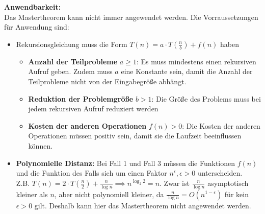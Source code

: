 \documentclass[
../AuD-Zusammenfassung.tex,
]
{subfiles}
\begin{document}
\textbf{Anwendbarkeit:}\\
Das Mastertheorem kann nicht immer angewendet werden. Die Vorraussetzungen für Anwendung sind:
\begin{itemize}
    \item Rekursionsgleichung muss die Form $T(n) = a\cdot T(\frac{n}{b}) + f(n)$ haben
    \begin{itemize}
        \item \textbf{Anzahl der Teilprobleme} $a \geq 1$: Es muss mindestens einen rekursiven Aufruf geben. Zudem muss $a$ eine Konstante sein, damit die Anzahl der Teilprobleme nicht von der Eingabegröße abhängt.
        \item \textbf{Reduktion der Problemgröße} $b > 1$:  Die Größe des Problems muss bei jedem rekursiven Aufruf reduziert werden
        \item \textbf{Kosten der anderen Operationen} $f(n) > 0$:  Die Kosten der anderen Operationen müssen positiv sein, damit sie die Laufzeit beeinflussen können.
    \end{itemize}
    \item \textbf{Polynomielle Distanz:} Bei Fall 1 und Fall 3 müssen die Funktionen $f(n)$ und die Funktion des Falls sich um einen Faktor $n^{\epsilon}, \epsilon > 0$ unterscheiden.\\
    Z.B. $T(n) = 2\cdot T(\frac{n}{2}) + \frac{n}{\log n} \implies n^{\log_2 2} = n$. Zwar ist $\frac{n}{\log n}$ asymptotisch kleiner als $n$, aber nicht polynomiell kleiner, da $\frac{n}{\log n} = O(n^{1-\epsilon})$ für kein $\epsilon > 0$ gilt. Deshalb kann hier das Mastertheorem nicht angewendet werden.
\end{itemize}
\end{document}

